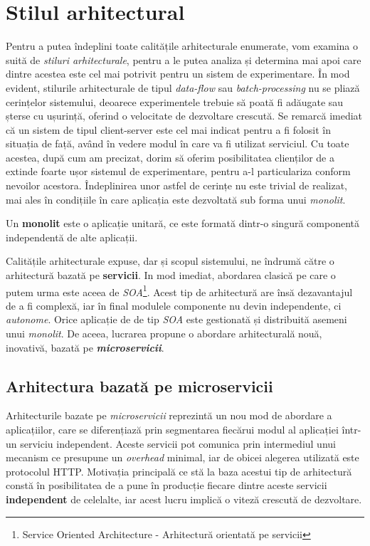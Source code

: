 \section{Stilul arhitectural}

Pentru a putea îndeplini toate calitățile arhitecturale enumerate, vom examina o suită de \textit{stiluri arhitecturale}, pentru a le putea analiza și determina mai apoi care dintre acestea este cel mai potrivit pentru un sistem de experimentare. În mod evident, stilurile arhitecturale de tipul \textit{data-flow} sau \textit{batch-processing} nu se pliază cerințelor sistemului, deoarece experimentele trebuie să poată fi adăugate sau șterse cu ușurință, oferind o velocitate de dezvoltare crescută. Se remarcă imediat că un sistem de tipul client-server este cel mai indicat pentru a fi folosit în situația de față, având în vedere modul în care va fi utilizat serviciul. Cu toate acestea, după cum am precizat, dorim să oferim posibilitatea clienților de a extinde foarte ușor sistemul de experimentare, pentru a-l particulariza conform nevoilor acestora. Îndeplinirea unor astfel de cerințe nu este trivial de realizat, mai ales în condițiile în care aplicația este dezvoltată sub forma unui \textit{monolit}.

\begin{definition}
	Un \textbf{monolit} este o aplicație unitară, ce este formată dintr-o singură componentă independentă de alte aplicații.
\end{definition}

Calitățile arhitecturale expuse, dar și scopul sistemului, ne îndrumă către o arhitectură bazată pe \textbf{servicii\textit{}}. In mod imediat, abordarea clasică pe care o putem urma este aceea de \textit{SOA}\footnote{Service Oriented Architecture - Arhitectură orientată pe servicii}. Acest tip de arhitectură are însă dezavantajul de a fi complexă, iar în final modulele componente nu devin independente, ci \textit{autonome}. Orice aplicație de de tip \textit{SOA} este gestionată și distribuită asemeni unui \textit{monolit}. De aceea, lucrarea propune o abordare arhitecturală nouă, inovativă, bazată pe \textbf{\textit{microservicii}}.\cite{buildingmicro} 

\subsection{Arhitectura bazată pe microservicii}

Arhitecturile bazate pe \textit{microservicii} reprezintă un nou mod de abordare a aplicațiilor, care se diferențiază prin segmentarea fiecărui modul al aplicației într-un serviciu independent. Aceste servicii pot comunica prin intermediul unui mecanism ce presupune un \textit{overhead} minimal, iar de obicei alegerea utilizată este protocolul HTTP\cite{onmicro}. Motivația principală ce stă la baza acestui tip de arhitectură constă în posibilitatea de a pune în producție fiecare dintre aceste servicii \textbf{independent} de celelalte, iar acest lucru implică o viteză crescută de dezvoltare.

